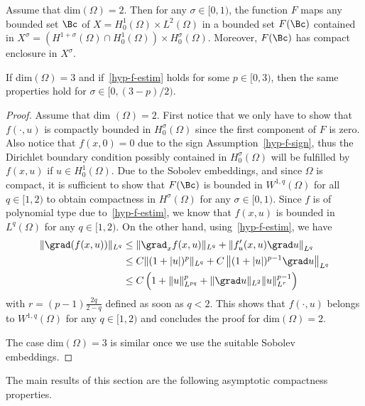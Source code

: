 \begin{prop}\label{prop-compact-F}
Assume that dim$(\Omega)=2$. Then for any $\sigma\in [0,1)$, the function $F$ maps any bounded set $\Bc$ of $X=H^1_0(\Omega)\times L^2(\Omega)$ in a bounded set $F(\Bc)$ contained in $X^\sigma= (H^{1+\sigma}(\Omega)\cap H^1_0(\Omega))\times H^\sigma_0(\Omega)$. Moreover, $F(\Bc)$ has compact enclosure in $X^\sigma$.

If dim$(\Omega)=3$ and if~\eqref{hyp-f-estim} holds for some $p\in [0,3)$, then the same properties hold for $\sigma\in [0,(3-p)/2)$.
\end{prop}
\begin{proof}
Assume that dim $(\Omega)=2$. First notice that we only have to show that $f(\cdot,u)$ is compactly bounded in $H^\sigma_0(\Omega)$ since the first component of $F$ is zero. Also notice that $f(x,0)=0$ due to the sign Assumption~\eqref{hyp-f-sign}, thus the Dirichlet boundary condition possibly contained in $H^\sigma_0(\Omega)$ will be fulfilled by $f(x,u)$ if $u\in H^1_0(\Omega)$. Due to the Sobolev embeddings, and since $\Omega$ is compact, it is sufficient to show that $F(\Bc)$ is bounded in $W^{1,q}(\Omega)$ for all $q\in [1,2)$ to obtain compactness in $H^\sigma(\Omega)$ for any $\sigma\in [0,1)$. Since $f$ is of polynomial type due to~\eqref{hyp-f-estim}, we know that $f(x,u)$ is bounded in $L^q(\Omega)$ for any $q\in [1,2)$. On the other hand, using~\eqref{hyp-f-estim}, we have
\begin{align*}
\|\grad(f(x,u))\|_{L^q} & \leq \|\grad_xf(x,u)\|_{L^q} + \left\|f'_u(x,u)\grad u\right\|_{L^q}\\
& \leq C \|(1+|u|)^p \|_{L^q} + C \left\|(1+|u|)^{p-1} \grad u\right\|_{L^q}\\
& \leq C\left(1+\|u\|_{L^{pq}}^p + \|\grad u\|_{L^2} \|u\|^{p-1}_{L^r}\right)
\end{align*}
with $r=(p-1)\frac {2q}{2-q}$ defined as soon as $q<2$. This shows that $f(\cdot,u)$ belongs to $W^{1,q}(\Omega)$ for any $q\in [1,2)$ and concludes the proof for dim$(\Omega)=2$.

The case dim$(\Omega)=3$ is similar once we use the suitable Sobolev embeddings.
\end{proof}


The main results of this section are the following asymptotic compactness properties.

